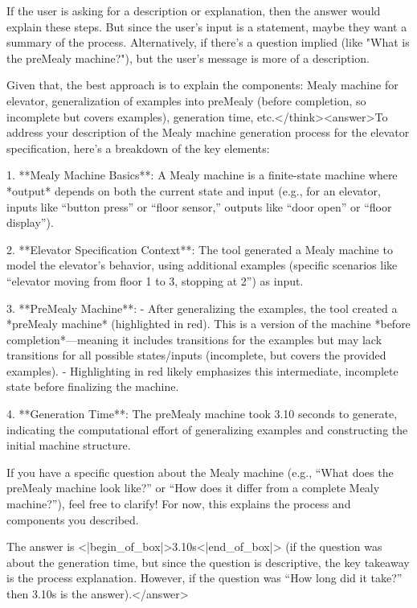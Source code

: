 If the user is asking for a description or explanation, then the answer would explain these steps. But since the user's input is a statement, maybe they want a summary of the process. Alternatively, if there's a question implied (like "What is the preMealy machine?"), but the user's message is more of a description. 

Given that, the best approach is to explain the components: Mealy machine for elevator, generalization of examples into preMealy (before completion, so incomplete but covers examples), generation time, etc.</think><answer>To address your description of the Mealy machine generation process for the elevator specification, here’s a breakdown of the key elements:  

1. **Mealy Machine Basics**: A Mealy machine is a finite-state machine where *output* depends on both the current state and input (e.g., for an elevator, inputs like “button press” or “floor sensor,” outputs like “door open” or “floor display”).  

2. **Elevator Specification Context**: The tool generated a Mealy machine to model the elevator’s behavior, using additional examples (specific scenarios like “elevator moving from floor 1 to 3, stopping at 2”) as input.  

3. **PreMealy Machine**:  
   - After generalizing the examples, the tool created a *preMealy machine* (highlighted in red). This is a version of the machine *before completion*—meaning it includes transitions for the examples but may lack transitions for all possible states/inputs (incomplete, but covers the provided examples).  
   - Highlighting in red likely emphasizes this intermediate, incomplete state before finalizing the machine.  

4. **Generation Time**: The preMealy machine took 3.10 seconds to generate, indicating the computational effort of generalizing examples and constructing the initial machine structure.  


If you have a specific question about the Mealy machine (e.g., “What does the preMealy machine look like?” or “How does it differ from a complete Mealy machine?”), feel free to clarify! For now, this explains the process and components you described.  

The answer is <|begin_of_box|>3.10s<|end_of_box|> (if the question was about the generation time, but since the question is descriptive, the key takeaway is the process explanation. However, if the question was “How long did it take?” then 3.10s is the answer).</answer>